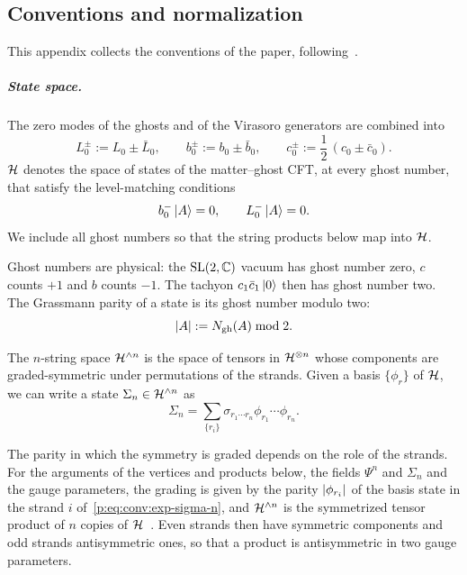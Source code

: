 \subsection{Conventions and normalization}
\label{p:app:conventions}

This appendix collects the conventions of the paper, following~\cite{Erbin:2021:StringFieldTheory}.


\subparagraph{State space.}

The zero modes of the ghosts and of the Virasoro generators are combined into
\begin{equation}
  \label{p:eq:conv:pm-operators}
  L_0^\pm
    := L_0 \pm \bar L_0,
  \qquad
  b_0^\pm
    := b_0 \pm \bar b_0,
  \qquad
  c_0^\pm
    := \frac{1}{2} \, (c_0 \pm \bar c_0).
\end{equation}
$\mathcal{H}$ denotes the space of states of the matter--ghost CFT, at every ghost number, that satisfy the level-matching conditions
\begin{equation}
  \label{p:eq:conv:level-matching}
  b_0^- \ket{A}
    = 0,
  \qquad
  L_0^- \ket{A}
    = 0.
\end{equation}
We include all ghost numbers so that the string products below map into $\mathcal{H}$.

Ghost numbers are physical: the $\mathrm{SL}(2, \mathbb{C})$ vacuum has ghost number zero, $c$ counts $+1$ and $b$ counts $-1$.
The tachyon $c_1 \bar c_1 \ket{0}$ then has ghost number two.
The Grassmann parity of a state is its ghost number modulo two:
\begin{equation}
  \label{p:eq:conv:parity}
  {|A|}
    := N_{\text{gh}}(A) \bmod 2.
\end{equation}

The $n$-string space $\mathcal{H}^{\wedge n}$ is the space of tensors in $\mathcal{H}^{\otimes n}$ whose components are graded-symmetric under permutations of the strands.
Given a basis $\{ \phi_r \}$ of ${\mathcal{H}}$, we can write a state $\Sigma_n \in {\mathcal{H}}^{\wedge n}$ as
\begin{equation}
  \label{p:eq:conv:exp-sigma-n}
  \Sigma_n
    = \sum_{\{ r_i \}} \sigma_{r_1 \cdots r_n} \phi_{r_1} \cdots \phi_{r_n}.
\end{equation}

The parity in which the symmetry is graded depends on the role of the strands.
For the arguments of the vertices and products below, the fields $\Psi^n$ and $\Sigma_n$ and the gauge parameters, the grading is given by the parity ${|\phi_{r_i}|}$ of the basis state in the strand $i$ of~\eqref{p:eq:conv:exp-sigma-n}, and $\mathcal{H}^{\wedge n}$ is the symmetrized tensor product of $n$ copies of ${\mathcal{H}}$~\cite{Erler:2014:NSNSSectorClosed,Erbin:2020:ClassicalAlgebraicStructures}.
Even strands then have symmetric components and odd strands antisymmetric ones, so that a product is antisymmetric in two gauge parameters.

